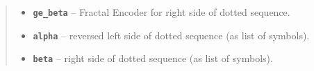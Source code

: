 \documentclass[letterpaper,10pt,english]{sphinxmanual}
\begin{document}
\begin{fulllineitems}
\begin{fulllineitems}
\begin{quote}
\begin{description}
\begin{itemize}
\item {} 
\textbf{\texttt{ge\_beta}} -- Fractal Encoder for right side of dotted sequence.

\item {} 
\textbf{\texttt{alpha}} -- reversed left side of dotted sequence (as list
of symbols).

\item {} 
\textbf{\texttt{beta}} -- right side of dotted sequence (as list of symbols).

\end{itemize}

\end{description}\end{quote}

\end{fulllineitems}


\end{fulllineitems}

\end{document}
